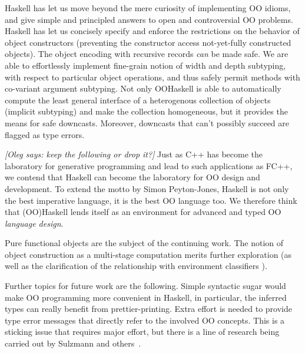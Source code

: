 \documentclass{jfp}
\newcommand{\oleg}[1]{{\it [Oleg says: #1]}}
\begin{document}
Haskell has let us move beyond the mere curiosity of implementing OO
idioms, and give simple and principled answers to open and
controversial OO problems. Haskell has let us concisely specify and
enforce the restrictions on the behavior of object constructors
(preventing the constructor access not-yet-fully constructed
objects). The object encoding with recursive records \emph{can} be
made safe. We are able to effortlessly implement fine-grain notion of
width and depth subtyping, with respect to particular object
operations, and thus safely permit methods with co-variant argument
subtyping. Not only OOHaskell is able to automatically compute the
least general interface of a heterogenous collection of objects
(implicit subtyping) and make the collection homogeneous, but it
provides the means for safe downcasts. Moreover, downcasts that can't
possibly succeed are flagged as type errors.


\oleg{keep the following or drop it?}
Just as C++ has become the laboratory for generative programming
\cite{DSL-in-three-lang} and lead to such applications as FC++, we
contend that Haskell can become the laboratory for OO design and
development.  To extend the motto by Simon Peyton-Jones, Haskell is
not only the best imperative language, it is the best OO language too.
We therefore think that (OO)Haskell lends itself as an environment for
advanced and typed OO \emph{language design}.

Pure functional objects are the subject of the continuing work.  The
notion of object construction as a multi-stage computation merits
further exploration (as well as the clarification of the relationship
with environment classifiers \cite{env-classifiers}).

Further topics for future work are the following.  Simple syntactic
sugar would make OO programming more convenient in Haskell, in
particular, the inferred types can really benefit from
prettier-printing.  Extra effort is needed to provide type error
messages that directly refer to the involved OO concepts.  This is a
sticking issue that requires major effort, but there is a line of
research being carried out by Sulzmann and others~\cite{SSW04}.
\end{document}
